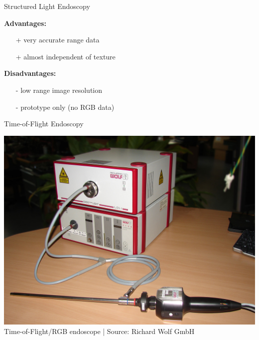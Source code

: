 \begin{frame}{Structured Light Endoscopy}

	\textbf{Advantages:}
	\begin{itemize}
		\item[+] very accurate range data
		\item[+] almost independent of texture
	\end{itemize}
	\vspace{1em}
	\textbf{Disadvantages:}
	\begin{itemize}
		\item[-] low range image resolution
		\item[-] prototype only (no RGB data)
	\end{itemize}

\end{frame}



\begin{frame}[c]{Time-of-Flight Endoscopy}

	\begin{center}
		\includegraphics[height=.8\textheight ]{images/tof}\\
		\scriptsize Time-of-Flight/RGB endoscope | Source: Richard Wolf GmbH
	\end{center}

\end{frame}



